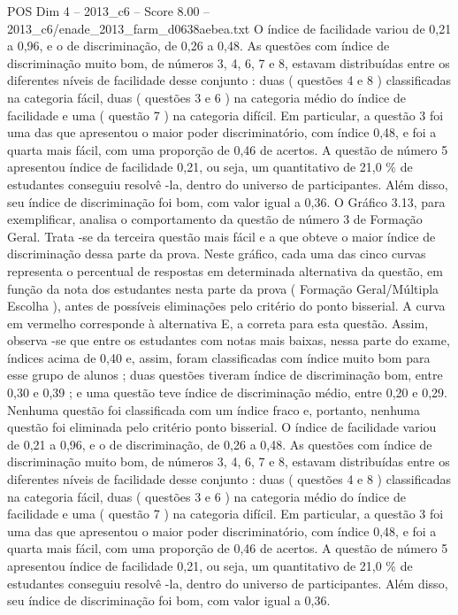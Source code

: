 \begin{textsample}{POS Dim 4 – 2013\_c6 – Score 8.00 – 2013\_c6/enade\_2013\_farm\_d0638aebea.txt}
O índice de facilidade variou de 0,21 a 0,96, e o de discriminação, de 0,26 a 0,48.
As questões com índice de discriminação muito bom, de números 3, 4, 6, 7 e 8, estavam distribuídas entre os diferentes níveis de facilidade desse conjunto : duas ( questões 4 e 8 ) classificadas na categoria fácil, duas ( questões 3 e 6 ) na categoria médio do índice de facilidade e uma ( questão 7 ) na categoria difícil.
Em particular, a questão 3 foi uma das que apresentou o maior poder discriminatório, com índice 0,48, e foi a quarta mais fácil, com uma proporção de 0,46 de acertos.
A questão de número 5 apresentou índice de facilidade 0,21, ou seja, um quantitativo de 21,0 \% de estudantes conseguiu resolvê -la, dentro do universo de participantes.
Além disso, seu índice de discriminação foi bom, com valor igual a 0,36.
O Gráfico 3.13, para exemplificar, analisa o comportamento da questão de número 3 de Formação Geral.
Trata -se da terceira questão mais fácil e a que obteve o maior índice de discriminação dessa parte da prova.
Neste gráfico, cada uma das cinco curvas representa o percentual de respostas em determinada alternativa da questão, em função da nota dos estudantes nesta parte da prova ( Formação Geral/Múltipla Escolha ), antes de possíveis eliminações pelo critério do ponto bisserial.
A curva em vermelho corresponde à alternativa E, a correta para esta questão.
Assim, observa -se que entre os estudantes com notas mais baixas, nessa parte do exame, índices acima de 0,40 e, assim, foram classificadas com índice muito bom para esse grupo de alunos ; duas questões tiveram índice de discriminação bom, entre 0,30 e 0,39 ; e uma questão teve índice de discriminação médio, entre 0,20 e 0,29.
Nenhuma questão foi classificada com um índice fraco e, portanto, nenhuma questão foi eliminada pelo critério ponto bisserial.
O índice de facilidade variou de 0,21 a 0,96, e o de discriminação, de 0,26 a 0,48.
As questões com índice de discriminação muito bom, de números 3, 4, 6, 7 e 8, estavam distribuídas entre os diferentes níveis de facilidade desse conjunto : duas ( questões 4 e 8 ) classificadas na categoria fácil, duas ( questões 3 e 6 ) na categoria médio do índice de facilidade e uma ( questão 7 ) na categoria difícil.
Em particular, a questão 3 foi uma das que apresentou o maior poder discriminatório, com índice 0,48, e foi a quarta mais fácil, com uma proporção de 0,46 de acertos.
A questão de número 5 apresentou índice de facilidade 0,21, ou seja, um quantitativo de 21,0 \% de estudantes conseguiu resolvê -la, dentro do universo de participantes.
Além disso, seu índice de discriminação foi bom, com valor igual a 0,36.

\end{textsample}
